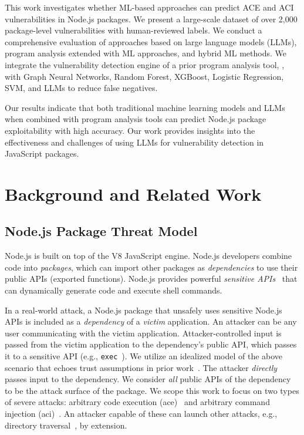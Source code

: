\documentclass[12pt,openany,oneside,table]{cmuthesis}
\begin{document}
This work investigates whether ML-based approaches can predict ACE and ACI vulnerabilities in Node.js packages. We present a large-scale dataset of over 2,000 package-level vulnerabilities with human-reviewed labels. We conduct a comprehensive evaluation of approaches based on large language models (LLMs), program analysis extended with ML approaches, and hybrid ML methods.
We integrate the vulnerability detection engine of a prior program analysis tool, \nodemedic, with Graph Neural Networks, Random Forest, XGBoost, Logistic Regression, SVM, and LLMs to reduce false negatives.

Our results indicate that 
both traditional machine learning models and LLMs when combined with program analysis tools can predict Node.js package exploitability with high accuracy.
Our work provides insights into the effectiveness and challenges of using LLMs for vulnerability detection in JavaScript packages.

\section{Background and Related Work}

\subsection{Node.js Package Threat Model}
\label{sec:background:threat-model}

Node.js is built on top of the V8 JavaScript engine. Node.js developers combine code into {\em packages}, which can import other packages as \emph{dependencies} to use their public APIs (exported functions). Node.js provides powerful \emph{sensitive APIs}~\cite{eval_fn,new_function_fn,exec_fn,execsync_fn} that can dynamically generate code and execute shell commands.

In a real-world attack, a Node.js package that unsafely uses sensitive Node.js APIs is included as a \emph{dependency} of a \emph{victim} application. An attacker can be any user communicating with the victim application. Attacker-controlled input is passed from the victim application to the dependency's public API, which passes it to a sensitive API (e.g., \lstinline|exec|~\cite{exec_fn}). We utilize an idealized model of the above scenario that echoes trust assumptions in prior work~\cite{staicu-SYNODE,nodemedic-fine,cassel2023nodemedic}. The attacker \emph{directly} passes input to the dependency. We consider \emph{all} public APIs of the dependency to be the attack surface of the package. We scope this work to focus on two types of severe attacks: arbitrary code execution (\gls{ace})~\cite{cwe_94} and arbitrary command injection (\gls{aci})~\cite{cwe_77}. An attacker capable of these can launch other attacks, e.g., directory traversal~\cite{cwe_22}, by extension.
\end{document}
